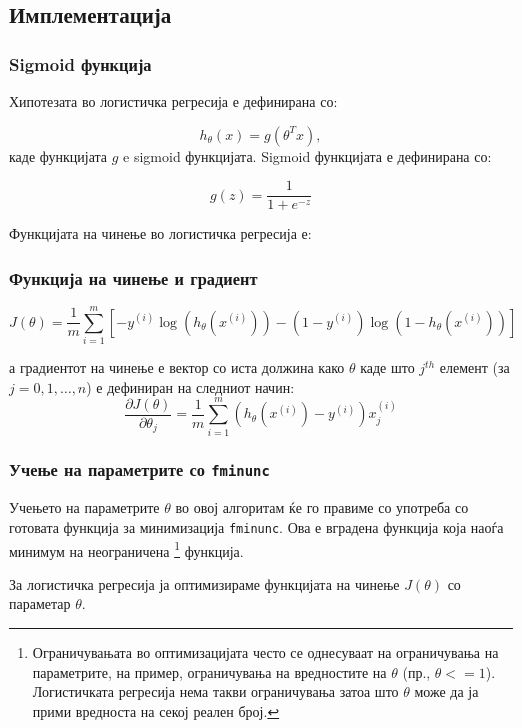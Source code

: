\subsection{Имплементација}

\subsubsection{Sigmoid функција}

Хипотезата во логистичка регресија е дефинирана со:

\[
	h_{\theta}(x) = g(\theta^Tx),
\]
каде функцијата $g$ e sigmoid функцијата. Sigmoid функцијата е дефинирана со:

\[
	g(z) = \frac{1}{1 + e^{-z}}
\]



Функцијата на чинење во логистичка регресија е:

\subsubsection{Функција на чинење и градиент}
\[
	J(\theta) = \frac{1}{m}\sum^m_{i=1} \left[ -y^{(i)} \log(h_\theta(x^{(i)})) -
	(1 - y^{(i)})\log(1 - h_\theta(x^{(i)})) \right]
\]

а градиентот на чинење е вектор со иста должина како $\theta$ каде што $j^{th}$
елемент (за $j = 0, 1, \ldots ,n$) е дефиниран на следниот начин:
\[
	\frac{\partial J(\theta)}{\partial\theta_j} =
	\frac{1}{m}\sum^m_{i=1}{(h_\theta(x^{(i)}) - y^{(i)})}x^{(i)}_j
\]

\subsubsection{Учење на параметрите со \texttt{fminunc}}
Учењето на параметрите $\theta$ во овој алгоритам ќе го правиме со употреба со
готовата функција за минимизација \texttt{fminunc}. Ова е вградена функција која
наоѓа минимум на неограничена \footnote{Ограничувањата во оптимизацијата често се однесуваат на ограничувања на
параметрите, на пример, ограничувања на вредностите на $\theta$ (пр., $\theta
<= 1$). Логистичката регресија нема такви ограничувања затоа што $\theta$ може
да ја прими вредноста на секој реален број.} функција.

За логистичка регресија ја оптимизираме функцијата на чинење $J(\theta)$ со
параметар $\theta$.

